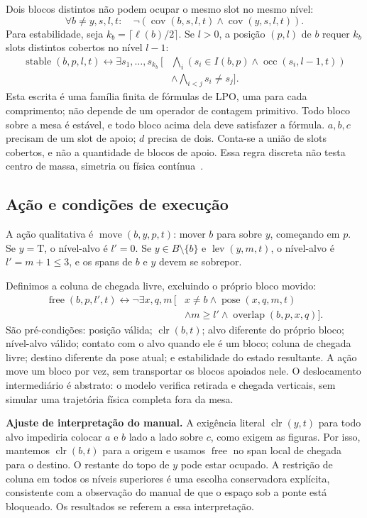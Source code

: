 \documentclass[11pt,a4paper]{article}
\newcommand{\lev}{\operatorname{lev}}
\newcommand{\clr}{\operatorname{clr}}
\newcommand{\cov}{\operatorname{cov}}
\newcommand{\occ}{\operatorname{occ}}
\newcommand{\pose}{\operatorname{pose}}
\newcommand{\stable}{\operatorname{stable}}
\newcommand{\free}{\operatorname{free}}
\newcommand{\mv}{\operatorname{move}}
\newcommand{\Ov}{\operatorname{overlap}}
\newcommand{\T}{\mathrm{T}}
\begin{document}
Dois blocos distintos não podem ocupar o mesmo slot no mesmo nível:
\[
\forall b\neq y,s,l,t:\quad\neg(\cov(b,s,l,t)\land\cov(y,s,l,t)).
\]
Para estabilidade, seja $k_b=\lceil\ell(b)/2\rceil$. Se $l>0$, a posição $(p,l)$ de $b$ requer $k_b$ slots distintos cobertos no nível $l-1$:
\begin{align}
\stable(b,p,l,t)\leftrightarrow\exists s_1,\ldots,s_{k_b}\,[&\bigwedge_i(s_i\in I(b,p)\land\occ(s_i,l-1,t))\nonumber\\[-3pt]
 &\land\bigwedge_{i<j}s_i\neq s_j].
\end{align}
Esta escrita é uma família finita de fórmulas de LPO, uma para cada comprimento; não depende de um operador de contagem primitivo. Todo bloco sobre a mesa é estável, e todo bloco acima dela deve satisfazer a fórmula. $a,b,c$ precisam de um slot de apoio; $d$ precisa de dois. Conta-se a união de slots cobertos, e não a quantidade de blocos de apoio. Essa regra discreta não testa centro de massa, simetria ou física contínua~\cite{manual}.

\subsection{Ação e condições de execução}
A ação qualitativa é $\mv(b,y,p,t)$: mover $b$ para sobre $y$, começando em $p$. Se $y=\T$, o nível-alvo é $l'=0$. Se $y\in B\setminus\{b\}$ e $\lev(y,m,t)$, o nível-alvo é $l'=m+1\leq3$, e os spans de $b$ e $y$ devem se sobrepor.

Definimos a coluna de chegada livre, excluindo o próprio bloco movido:
\begin{align}
\free(b,p,l',t)\leftrightarrow\neg\exists x,q,m\,[&x\neq b\land\pose(x,q,m,t)\nonumber\\[-3pt]
 &\land m\geq l'\land\Ov(b,p,x,q)].
\end{align}
São pré-condições: posição válida; $\clr(b,t)$; alvo diferente do próprio bloco; nível-alvo válido; contato com o alvo quando ele é um bloco; coluna de chegada livre; destino diferente da pose atual; e estabilidade do estado resultante. A ação move um bloco por vez, sem transportar os blocos apoiados nele. O deslocamento intermediário é abstrato: o modelo verifica retirada e chegada verticais, sem simular uma trajetória física completa fora da mesa.

\textbf{Ajuste de interpretação do manual.} A exigência literal $\clr(y,t)$ para todo alvo impediria colocar $a$ e $b$ lado a lado sobre $c$, como exigem as figuras. Por isso, mantemos $\clr(b,t)$ para a origem e usamos $\free$ no span local de chegada para o destino. O restante do topo de $y$ pode estar ocupado. A restrição de coluna em todos os níveis superiores é uma escolha conservadora explícita, consistente com a observação do manual de que o espaço sob a ponte está bloqueado. Os resultados se referem a essa interpretação.
\end{document}
